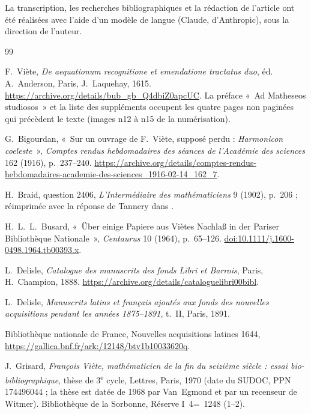 \documentclass[11pt,a4paper]{article}
\theoremstyle{remark}
\begin{document}
La transcription, les recherches bibliographiques et la rédaction de
l'article ont été réalisées avec l'aide d'un modèle de langue (Claude,
d'Anthropic), sous la direction de l'auteur.

{\small\begin{thebibliography}{99}\setlength{\itemsep}{1pt}

F.~Viète, \emph{De aequationum recognitione et emendatione tractatus duo},
éd. A.~Anderson, Paris, J.~Laquehay, 1615.
\url{https://archive.org/details/bub_gb_Q4dbiZ0apcUC}. La préface
«~Ad Matheseos studiosos~» et la liste des suppléments occupent les
quatre pages non paginées qui précèdent le texte (images n12 à n15 de la
numérisation).

G.~Bigourdan, «~Sur un ouvrage de F.~Viète, supposé perdu :
\emph{Harmonicon coeleste}~», \emph{Comptes rendus hebdomadaires des
séances de l'Académie des sciences} 162 (1916), p.~237--240.
\url{https://archive.org/details/comptes-rendus-hebdomadaires-academie-des-sciences_1916-02-14_162_7}.

H.~Braid, question 2406, \emph{L'Intermédiaire des mathématiciens} 9
(1902), p.~206 ; réimprimée avec la réponse de Tannery dans
\cite[p.~410]{tannery1902}.

H.~L.~L.~Busard, «~Über einige Papiere aus Viètes Nachlaß in der Pariser
Bibliothèque Nationale~», \emph{Centaurus} 10 (1964), p.~65--126.
\href{https://doi.org/10.1111/j.1600-0498.1964.tb00393.x}{doi:10.1111/j.1600-0498.1964.tb00393.x}.

L.~Delisle, \emph{Catalogue des manuscrits des fonds Libri et Barrois},
Paris, H.~Champion, 1888.
\url{https://archive.org/details/cataloguelibri00bibl}.

L.~Delisle, \emph{Manuscrits latins et français ajoutés aux fonds des
nouvelles acquisitions pendant les années 1875--1891}, t.~II, Paris, 1891.

Bibliothèque nationale de France, Nouvelles acquisitions latines 1644,
\url{https://gallica.bnf.fr/ark:/12148/btv1b10033620q}.

J.~Grisard, \emph{François Viète, mathématicien de la fin du seizième
siècle : essai bio-bibliographique}, thèse de 3\textsuperscript{e} cycle,
Lettres, Paris, 1970 (date du SUDOC, PPN 174496044 ; la thèse est datée de
1968 par Van~Egmond et par un recenseur de Witmer). Bibliothèque de la
Sorbonne, Réserve I~4=~1248 (1--2).


\end{thebibliography}}
\end{document}

